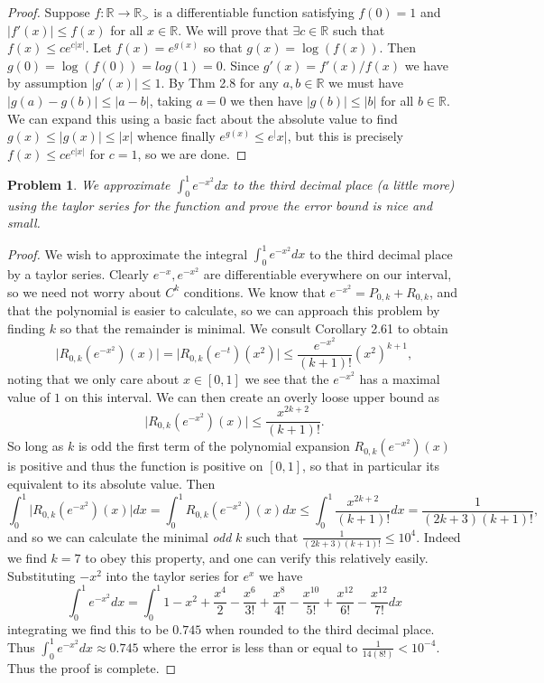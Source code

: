 \documentclass{report}
\providecommand{\abs}[1]{\lvert#1\rvert}
\providecommand{\R}{\mathbb{R}}
\DeclareMathOperator{\log}{log}
\newtheorem{problem}{Problem}
\begin{document}
\begin{proof}
  Suppose $f:\R\to \R_>$  is a differentiable function satisfying $f(0)=1$ and $\abs{f'(x)}\leq f(x)$ for all $x\in \R$. We will prove that $\exists c\in \R$ such that $f(x)\leq ce^{c\abs{x}}$. Let $f(x)=e^{g(x)}$ so that $g(x)=\log(f(x))$. Then $g(0)=\log(f(0))=log(1)=0$. Since $g'(x)=f'(x)/f(x)$ we have by assumption $\abs{g'(x)}\leq 1$. By Thm 2.8 for any $a,b\in \R$ we must have $\abs{g(a)-g(b)}\leq \abs{a-b}$, taking $a=0$ we then have $\abs{g(b)}\leq \abs{b}$ for all $b\in \R$. We can expand this using a basic fact about the absolute value to find $g(x)\leq \abs{g(x)}\leq \abs{x}$ whence finally $e^{g(x)}\leq e^\abs{x}$, but this is precisely $f(x)\leq ce^{c\abs{x}}$ for $c=1$, so we are done.
\end{proof}

\begin{problem}
  We approximate $\int_0^1 e^{-x^2}dx$ to the third decimal place (a little more) using the taylor series for the function and prove the error bound is nice and small.
\end{problem}

\begin{proof}
  We wish to approximate the integral $\int_0^1e^{-x^2}dx$ to the third decimal place by a taylor series. Clearly $e^{-x}, e^{-x^2}$ are differentiable everywhere on our interval, so we need not worry about $C^k$ conditions. We know that $e^{-x^2}=P_{0,k}+R_{0,k}$, and that the polynomial is easier to calculate, so we can approach this problem by finding $k$ so that the remainder is minimal. We consult Corollary 2.61 to obtain
  \[\abs{R_{0,k}(e^{-x^2})(x)}=\abs{R_{0,k}(e^{-t})(x^2)}\leq \frac{e^{-x^2}}{(k+1)!}(x^2)^{k+1},\]
  noting that we only care about $x\in [0,1]$ we see that the $e^{-x^2}$ has a maximal value of $1$ on this interval. We can then create an overly loose upper bound as
  \[\abs{R_{0,k}(e^{-x^2})(x)}\leq \frac{x^{2k+2}}{(k+1)!}.\]
    So long as $k$ is odd the first term of the polynomial expansion $R_{0,k}(e^{-x^2})(x)$ is positive and thus the function is positive on $[0,1]$, so that in particular its equivalent to its absolute value. Then
    \[\int_0^1\abs{R_{0,k}(e^{-x^2})(x)}dx=\int_0^1 R_{0,k}(e^{-x^2})(x)dx\leq \int_0^1 \frac{x^{2k+2}}{(k+1)!}dx=\frac{1}{(2k+3)(k+1)!},\]
    and so we can calculate the minimal \textit{odd} $k$ such that $\frac{1}{(2k+3)(k+1)!}\leq 10^4$. Indeed we find $k=7$ to obey this property, and one can verify this relatively easily.
      Substituting $-x^2$ into the taylor series for $e^x$ we have
    \[\int_0^1 e^{-x^2}dx=\int_0^1 1-x^2+\frac{x^4}{2}-\frac{x^6}{3!}+\frac{x^8}{4!}-\frac{x^{10}}{5!}+\frac{x^{12}}{6!}-\frac{x^{12}}{7!} dx\]
    integrating we find this to be $0.745$ when rounded to the third decimal place. Thus $\int_0^1 e^{-x^2}dx\approx 0.745$ where the error is less than or equal to $\frac{1}{14(8!)}<10^{-4}$. Thus the proof is complete.
\end{proof}
\end{document}
